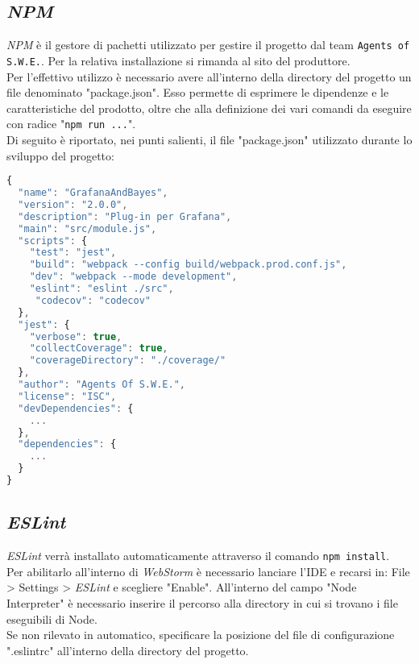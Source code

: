 \subsection{\textit{NPM}}\label{npm}
\textit{NPM} è il gestore di pachetti utilizzato per gestire il progetto dal team \texttt{Agents of S.W.E.}. Per la relativa installazione si rimanda al sito del produttore.\\
Per l'effettivo utilizzo è necessario avere all'interno della directory del progetto un file denominato "package.json". Esso permette di esprimere le dipendenze e le caratteristiche del prodotto, oltre che alla definizione dei vari comandi da eseguire con radice "\texttt{npm run ...}".\\
Di seguito è riportato, nei punti salienti, il file "package.json" utilizzato durante lo sviluppo del progetto:\\
\begin{lstlisting}[language=JavaScript]
{
  "name": "GrafanaAndBayes",
  "version": "2.0.0",
  "description": "Plug-in per Grafana",
  "main": "src/module.js",
  "scripts": {
    "test": "jest",
    "build": "webpack --config build/webpack.prod.conf.js",
    "dev": "webpack --mode development",
    "eslint": "eslint ./src",
     "codecov": "codecov"
  },
  "jest": {
    "verbose": true,
    "collectCoverage": true,
    "coverageDirectory": "./coverage/"
  },
  "author": "Agents Of S.W.E.",
  "license": "ISC",
  "devDependencies": {
    ...
  },
  "dependencies": {
    ...
  }
}
\end{lstlisting}

\subsection{\textit{ESLint}}\label{eslint}
\textit{ESLint} verrà installato automaticamente attraverso il comando \texttt{npm install}.\\
Per abilitarlo all'interno di \textit{WebStorm} è necessario lanciare l'IDE e recarsi in: File > Settings > \textit{ESLint} e scegliere "Enable". All'interno del campo "Node Interpreter" è necessario inserire il percorso alla directory in cui si trovano i file eseguibili di Node.\\
Se non rilevato in automatico, specificare la posizione del file di configurazione ".eslintrc" all'interno della directory del progetto.

